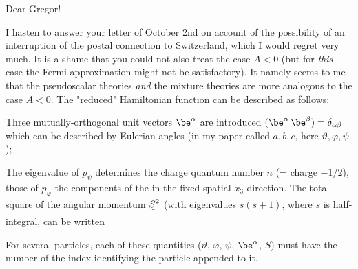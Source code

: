 \date{November 12, 1942}


Dear Gregor!

I hasten to answer your letter of October 2nd on account of the possibility of an interruption of the postal connection to Switzerland, which I would regret very much. It is a shame that you could not also treat the case $A<0$ (but for \textit{this} case the Fermi approximation might not be satisfactory). It namely seems to me that the pseudoscalar theories \textit{and} the mixture theories are more analogous to the case $A<0$. The "reduced" Hamiltonian function can be described as follows:

Three mutually-orthogonal unit vectors $\be^\alpha$ are introduced $(\be^\alpha\,\be^\beta)=\delta_{\alpha\beta}$ which can be described by Eulerian angles (in my paper called $a,b,c$, here $\vartheta,\varphi,\psi$);

The eigenvalue of $p_\psi$ determines the charge quantum number $n$ (= charge $- 1/2$), those of $p_\varphi$ the components of the  in the fixed spatial $x_3$-direction. The total square of the angular momentum $\uwave{S}^2$ (with eigenvalues $s(s+1)$, where $s$ is half-integral, can be written

For several particles, each of these quantities ($\vartheta$, $\varphi$, $\psi$, $\be^\alpha$, $S$) must have the number of the index identifying the particle appended to it.

